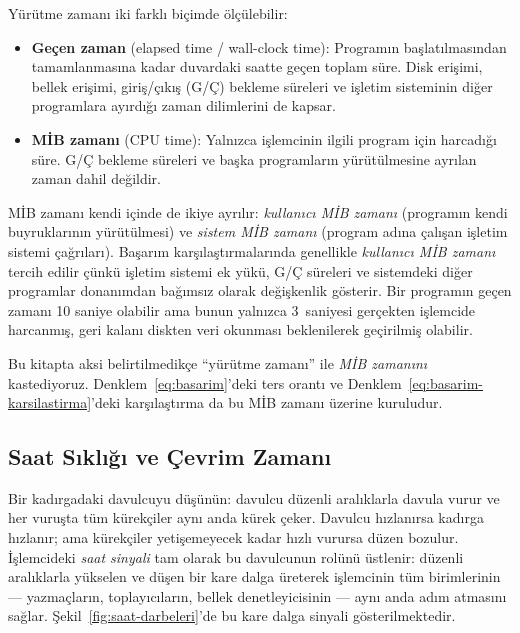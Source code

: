 Yürütme zamanı iki farklı biçimde ölçülebilir:

\begin{itemize}
    \item \textbf{Geçen zaman} (elapsed time / wall-clock time): Programın başlatılmasından tamamlanmasına kadar duvardaki saatte geçen toplam süre. Disk erişimi, bellek erişimi, giriş/çıkış (G/Ç) bekleme süreleri ve işletim sisteminin diğer programlara ayırdığı zaman dilimlerini de kapsar.
    \item \textbf{MİB zamanı} (CPU time): Yalnızca işlemcinin ilgili program için harcadığı süre. G/Ç bekleme süreleri ve başka programların yürütülmesine ayrılan zaman dahil değildir.
\end{itemize}

MİB zamanı kendi içinde de ikiye ayrılır: \emph{kullanıcı MİB zamanı} (programın kendi buyruklarının yürütülmesi) ve \emph{sistem MİB zamanı} (program adına çalışan işletim sistemi çağrıları). Başarım karşılaştırmalarında genellikle \emph{kullanıcı MİB zamanı} tercih edilir çünkü işletim sistemi ek yükü, G/Ç süreleri ve sistemdeki diğer programlar donanımdan bağımsız olarak değişkenlik gösterir. Bir programın geçen zamanı 10 saniye olabilir ama bunun yalnızca 3~saniyesi gerçekten işlemcide harcanmış, geri kalanı diskten veri okunması beklenilerek geçirilmiş olabilir.

\noindent Bu kitapta aksi belirtilmedikçe ``yürütme zamanı'' ile \emph{MİB zamanını} kastediyoruz. Denklem~\ref{eq:basarim}'deki ters orantı ve Denklem~\ref{eq:basarim-karsilastirma}'deki karşılaştırma da bu MİB zamanı üzerine kuruludur.

\subsection{Saat Sıklığı ve Çevrim Zamanı}
\label{subsec:saat-sikligi}

Bir kadırgadaki davulcuyu düşünün: davulcu düzenli aralıklarla davula vurur ve her vuruşta tüm kürekçiler aynı anda kürek çeker. Davulcu hızlanırsa kadırga hızlanır; ama kürekçiler yetişemeyecek kadar hızlı vurursa düzen bozulur. İşlemcideki \emph{saat sinyali} tam olarak bu davulcunun rolünü üstlenir: düzenli aralıklarla yükselen ve düşen bir kare dalga üreterek işlemcinin tüm birimlerinin --- yazmaçların, toplayıcıların, bellek denetleyicisinin --- aynı anda adım atmasını sağlar. Şekil~\ref{fig:saat-darbeleri}'de bu kare dalga sinyali gösterilmektedir.

